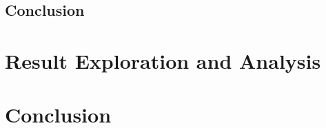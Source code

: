 \documentclass[11pt,a4paper, open=any]{scrbook}
\begin{document}
\section{Conclusion}

\chapter{Result Exploration and Analysis}\label{ch:results}

\chapter{Conclusion}

%
%

\
\printbibliography[check=pc]
\end{document}
